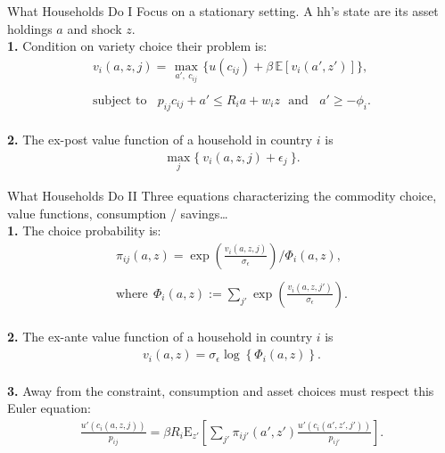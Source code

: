 \documentclass[9pt,pdftex,aspectratio=1610]{beamer}
\theoremstyle{definition}
\begin{document}

\begin{frame}[t]{What Households Do I}
Focus on a stationary setting. A hh's state are its asset holdings $a$ and shock $z$.\\
\smallskip
\textbf{1.} Condition on variety choice their problem is:
\begin{align}
v_{i}(a, z, j) =   \max_{\ a', \ c_{ij}  \ }\bigg  \{ u(c_{ij})  + \beta \, \mathbb{E} [v_{i}(a', z')]  \bigg\}, \nonumber \\
\nonumber \\
\mbox{subject to}  \ \ \  \  p_{ij}c_{ij} +  a' \leq    R_{i} a + w_{i} z \ \ \  \mbox{and} \ \ \ \ a' \geq - \phi_{i}. \nonumber
\end{align}\\
\bigskip
\textbf{2.} The ex-post value function of a household in country $i$ is
\begin{align}
\max_{j} \big  \{ \  v_{i}(a, z, j) + \epsilon_{j}  \ \big \}. \nonumber
\end{align}
\end{frame}


\begin{frame}[t]{What Households Do II}
Three equations characterizing the commodity choice, value functions, consumption / savings\ldots\\
\smallskip
\textbf{1.} The choice probability is:
\begin{align*}
\pi_{ij}(a, z) = \exp \left( \frac{ v_{i}(a, z, j) }{\sigma_{\epsilon}} \right) \Bigg / \Phi_{i}(a,z) ,\\
\\
\mbox{where} \ \ \Phi_{i}(a,z) := \sum_{j'} \exp \left( \frac{ v_{i}(a, z, j') }{\sigma_{\epsilon}}  \right).
\end{align*}\\
\bigskip
\textbf{2.} The ex-ante value function of a household in country $i$ is
\begin{align*}
v_i(a, z) = \sigma_{\epsilon} \log \left\{ \Phi_{i}(a,z)  \right\}.
\end{align*}\\
\bigskip
\textbf{3.} Away from the constraint, consumption and asset choices must respect this Euler equation:
\begin{align*}
\frac{u'(c_{i}(a, z, j))}{p_{ij}} = \beta R_{i} \mathrm{E}_{z'} \left[ \sum_{j'} \pi_{ij'}(a', z') \frac{u'(c_{i}(a', z', j'))}{p_{ij'}} \right].
\end{align*}
\end{frame}
\end{document}
